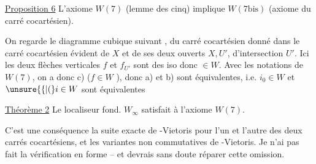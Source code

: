 \uline{Proposition 6} L'axiome $W(7)$ (lemme des cinq)
implique $W(7\mathrm{bis})$ (axiome du carré cocartésien).

On regarde le diagramme cubique suivant
, du carré cocartésien donné dans le carré cocartésien
évident de $X$ et de ses deux ouverts $X,U'$,
d'intersection $U'$. Ici les deux flèches verticales
$f$ et $f_{U'}$ sont des iso donc  $\in W$. Avec les
notations de $W(7)$, on a donc c) ($f\in W$ \unsure{!}),
donc a) et b) sont équivalentes, i.e. $i_0\in W$
et $\unsure{\{|(}i\in W$ sont équivalentes \hfill {}

\uline{Théorème 2} Le localiseur fond. $W_{\infty}$ satisfait à
l'axiome $W(7)$.

C'est  une conséquence   la suite exacte
de -Vietoris pour l'un  et l'autre
des deux carrés cocartésiens, et les variantes
non commutatives de -Vietoris. Je n'ai
pas fait la vérification en forme -- et devrais
sans doute réparer cette omission.
